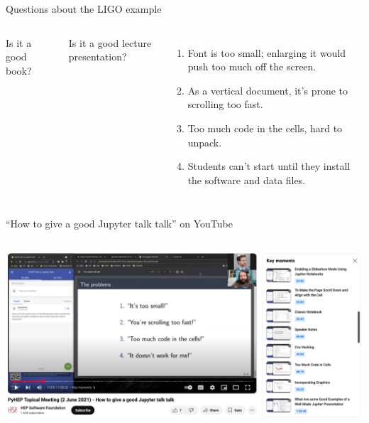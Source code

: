 \documentclass[aspectratio=169]{beamer}
\begin{document}
\begin{frame}{Questions about the LIGO example}
\Large
\vspace{0.5 cm}
\begin{columns}
Is it a good book?

\vspace{0.25 cm}

\vspace{1 cm}
Is it a good lecture presentation? 

\vspace{0.25 cm}
\begin{enumerate}
\item<4-> Font is too small; enlarging it would push too much off the screen.
\item<5-> As a vertical document, it's prone to scrolling too fast.
\item<6-> Too much code in the cells, hard to unpack.
\item<7-> Students can't start until they install the software and data files.
\end{enumerate}
\end{columns}
\end{frame}

\begin{frame}{``How to give a good Jupyter talk talk'' on YouTube}
\vspace{0.5 cm}
\begin{columns}
\href{https://youtu.be/UhidS7fZZko?si=Vyr35fZhaSuyyxSW}{\includegraphics[width=\linewidth]{img/jupyter-talk-talk.png}}
\end{columns}
\end{frame}
\end{document}

